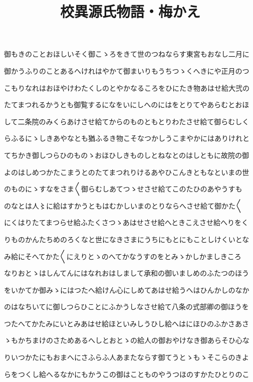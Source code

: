 \documentclass[a4paper,11pt,landscape]{ltjtarticle}
\title{校異源氏物語・梅かえ}
\date{}
\begin{document}
\maketitle

御もきのことおほしいそく御こゝろをきて世のつねならす東宮もおなし二月に
\par\medskip
御かうふりのことあるへけれはやかて御まいりもうちつゝくへきにや正月のつ
\par\medskip
こもりなれはおほやけわたくしのとやかなるころをひにたき物あはせ給大弐の
\par\medskip
たてまつれるかうとも御覧するになをいにしへのにはをとりてやあらむとおほ
\par\medskip
して二条院のみくらあけさせ給てからのものともとりわたさせ給て御らむしく
\par\medskip
らふるにゝしきあやなとも猶ふるき物こそなつかしうこまやかにはありけれと
\par\medskip
てちかき御しつらひのものゝおほひしきものしとねなとのはしともに故院の御
\par\medskip
よのはしめつかたこまうとのたてまつれりけるあやひこんきともなといまの世
\par\medskip
のものにゝすなをさま〱御らむしあてつゝせさせ給てこのたひのあやうすも
\par\medskip
のなとは人〻に給はすかうともはむかしいまのとりならへさせ給て御かた〱
\par\medskip
にくはりたてまつらせ給ふたくさつゝあはせさせ給へときこえさせ給へりをく
\par\medskip
りものかんたちめのろくなと世になきさまにうちにもとにもことしけくいとな
\par\medskip
み給にそへてかた〱にえりとゝのへてかなうすのをとみゝかしかましきころ
\par\medskip
なりおとゝはしんてんにはなれおはしまして承和の御いましめのふたつのほう
\par\medskip
をいかてか御みゝにはつたへ給けん心にしめてあはせ給うへはひんかしのなか
\par\medskip
のはなちいてに御しつらひことにふかうしなさせ給て八条の式部卿の御ほうを
\par\medskip
つたへてかたみにいとみあはせ給ほといみしうひし給へはにほひのふかさあさ
\par\medskip
ゝもかちまけのさためあるへしとおとゝの給人の御おやけなき御あらそひ心な
\par\medskip
りいつかたにもおまへにさふらふ人あまたならす御てうとゝもゝそこらのきよ
\par\medskip
らをつくし給へるなかにもかうこの御はことものやうつほのすかたひとりのこ
\end{document}
